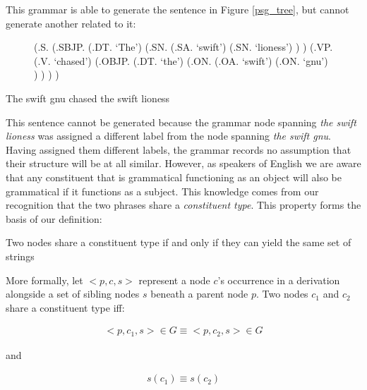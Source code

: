 \documentclass{article}
\begin{document}
This grammar is able to generate the sentence in Figure \ref{psg_tree}, but cannot generate another related to it:

\begin{figure}
\begin{parsetree}
(.S.
  (.SBJP.
    (.DT. `The')
    (.SN.
      (.SA. `swift')
      (.SN. `lioness')
    )
  )
  (.VP.
    (.V. `chased')
    (.OBJP.
      (.DT. `the')
      (.ON.
        (.OA. `swift')
	(.ON. `gnu')
      )
    )
  )
)
\end{parsetree}
\end{figure}



\begin{lexamples}
 \item * The swift gnu chased the swift lioness
\end{lexamples}

This sentence cannot be generated because the grammar node spanning \emph{the swift lioness} was assigned a different label from the node spanning \emph{the swift gnu}. Having assigned them different labels, the grammar records no assumption that their structure will be at all similar. However, as speakers of English we are aware that any constituent that is grammatical functioning as an object will also be grammatical if it functions as a subject. This knowledge comes from our recognition that the two phrases share a \emph{constituent type}. This property forms the basis of our definition:


\begin{definition}
 Two nodes share a constituent type if and only if they can yield the same set of strings
\end{definition}

More formally, let $<p, c, s>$ represent a node $c$'s occurrence in a derivation alongside a set of sibling nodes $s$ beneath a parent node $p$. Two nodes $c_1$ and $c_2$ share a constituent type iff:

\begin{eqnarray}
 <p, c_1, s> \in G \equiv <p, c_2, s> \in G
\end{eqnarray}

and

\begin{eqnarray}
 s(c_1) \equiv s(c_2)
\end{eqnarray}
\end{document}
